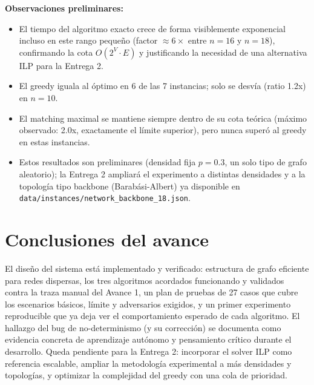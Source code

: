 \documentclass[11pt,a4paper]{article}
\begin{document}
\textbf{Observaciones preliminares:}
\begin{itemize}
	\item El tiempo del algoritmo exacto crece de forma visiblemente exponencial incluso en
	este rango pequeño (factor $\approx 6\times$ entre $n{=}16$ y $n{=}18$), confirmando la
	cota $O(2^V \cdot E)$ y justificando la necesidad de una alternativa ILP para la Entrega 2.
	\item El greedy iguala al óptimo en 6 de las 7 instancias; solo se desvía (ratio 1.2x) en
	$n{=}10$.
	\item El matching maximal se mantiene siempre dentro de su cota teórica (máximo observado:
	2.0x, exactamente el límite superior), pero nunca superó al greedy en estas instancias.
	\item Estos resultados son preliminares (densidad fija $p=0.3$, un solo tipo de grafo
	aleatorio); la Entrega 2 ampliará el experimento a distintas densidades y a la topología
	tipo backbone (Barabási-Albert) ya disponible en \texttt{data/instances/network\_backbone\_18.json}.
\end{itemize}

\section{Conclusiones del avance}

El diseño del sistema está implementado y verificado: estructura de grafo eficiente para
redes dispersas, los tres algoritmos acordados funcionando y validados contra la traza
manual del Avance 1, un plan de pruebas de 27 casos que cubre los escenarios básicos, límite
y adversarios exigidos, y un primer experimento reproducible que ya deja ver el
comportamiento esperado de cada algoritmo. El hallazgo del bug de no-determinismo (y su
corrección) se documenta como evidencia concreta de aprendizaje autónomo y pensamiento
crítico durante el desarrollo. Queda pendiente para la Entrega 2: incorporar el solver ILP
como referencia escalable, ampliar la metodología experimental a más densidades y topologías,
y optimizar la complejidad del greedy con una cola de prioridad.
\end{document}
